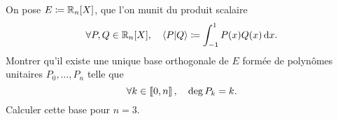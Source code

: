 \documentclass{magnolia}
\begin{document}
\begin{remarques}
\end{remarques}

\begin{exoUnique}
\exo On pose $E\defeq\polyR[n]$, que l'on munit du produit scalaire
  \[\forall P,Q\in\polyR[n]\qsep \ps{P}{Q}\defeq\integ{-1}{1}{P(x)Q(x)}{x}.\]
  Montrer qu'il existe une unique base orthogonale de $E$ formée de
  polynômes unitaires $P_0,\ldots,P_n$ telle que
  \[\forall k\in\left\llbracket 0,n\right\rrbracket,\quad \deg P_k=k.\]
  Calculer cette base pour $n=3$.
\end{exoUnique}
\end{document}
